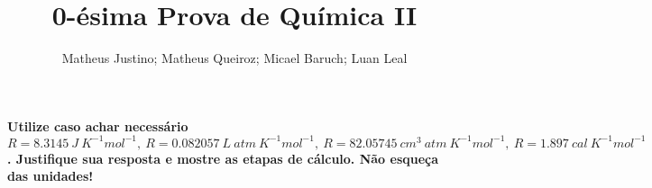 \documentclass{article}
\author{Matheus Justino; Matheus Queiroz; Micael Baruch; Luan Leal}
\title{0-ésima Prova de Química II}
\begin{document}
\maketitle

    \textbf{Utilize caso achar necessário \(R = \qty{8,3145}{J\ K^{-1} mol^{-1}}, \
    R = \qty{0,082057}{L\ atm\ K^{-1} mol^{-1}}, \ 
    R = \qty{82,05745}{cm^3\ atm\ K^{-1} mol^{-1}}, \
    R = \qty{1,897}{cal\ K^{-1} mol^{-1}}\).
    Justifique sua resposta e mostre as etapas de cálculo. Não esqueça das
    unidades!}
    
    
    
    
    
    
\end{document}
